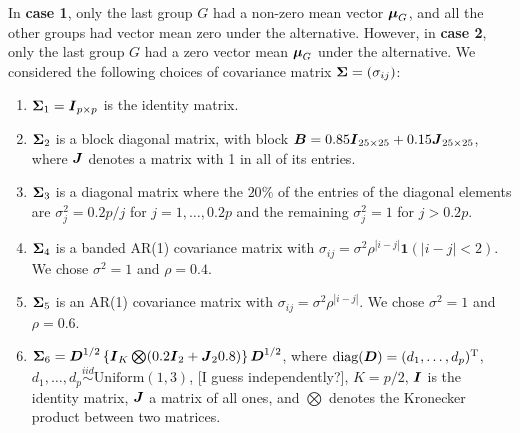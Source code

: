 \documentclass[times,sort&compress,3p]{elsarticle}
\theoremstyle{plain}%
\theoremstyle{definition}
\def\diag{\hbox{diag}}
\def\diag{\hbox{diag}}
\def\diag{\hbox{diag}}
\def\diag{\hbox{diag}}
\def\trans{^{\rm T}}
\def\bone{{\mathbf 1}}
\newcommand{\uB}       {\mbox{\boldmath$B$}}
\newcommand{\uD}       {\mbox{\boldmath$D$}}
\newcommand{\uI}       {\mbox{\boldmath$I$}}
\newcommand{\uJ}       {\mbox{\boldmath$J$}}
\newcommand{\ugamma}            {\mbox{\boldmath$\gamma$}}
\newcommand{\umu}               {\mbox{\boldmath$\mu$}}
\newcommand{\uSigma}            {\mbox{\boldmath$\Sigma$}}
\begin{document}
In \textbf{case 1}, only the last group $G$ had a non-zero mean vector $\umu_G$, and all the other groups had vector mean zero under the alternative. However, in \textbf{case 2}, only the last group $G$ had a zero vector mean $\umu_{G}$ under the alternative.
We considered the following choices of covariance matrix $\uSigma = (\sigma_{ij})$:
\begin{enumerate}
  \item $\uSigma_{1} = \uI_{p \times p} $ is the identity matrix.
  \item $\uSigma_{2} $ is a block diagonal matrix, with block $\uB = 0.85\uI_{25 \times 25} + 0.15\uJ_{25 \times 25}$, where $\uJ$ denotes a matrix with 1 in all of its entries.
  \item $\uSigma_{3}$ is a diagonal matrix where the $20\%$ of the entries of the diagonal elements are $\sigma^2_j = 0.2p/j$ for $j = 1, \ldots, 0.2p$ and the remaining $\sigma^2_j = 1$ for $j > 0.2p$.
  \item $\uSigma_4$ is a banded AR(1) covariance matrix with $\sigma_{ij}=\sigma^2\rho^{|i - j|}\bone(|i-j| < 2)$. We chose $\sigma^2 = 1$ and $\rho = 0.4$.
  \item $\uSigma_{5}$ is an AR(1) covariance matrix with $\sigma_{ij}=\sigma^2\rho^{|i - j|}$. We chose $\sigma^2 = 1$ and $\rho = 0.6$.
  \item $\uSigma_6 = \uD^{1/2}\left\{ \uI_K \bigotimes (0.2\uI_2 + \uJ_{2}0.8) \right\}\uD^{1/2}$, where $\diag(\uD)=(d_{1}, \ldots, d_{p})\trans$, $d_{1}, \ldots, d_{p} \stackrel{iid}{\sim} \text{Uniform}(1, 3)$,  {\color{blue}[I guess independently?]}, $K = p/2$, $\uI$ is the identity matrix, $\uJ$ a matrix of all ones, and $\bigotimes$ denotes the Kronecker product between two matrices.  
\end{enumerate}
\end{document}
